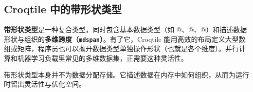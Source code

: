 \subsection*{Croqtile 中的带形状类型}

\textbf{带形状类型}是一种复合类型，同时包含基本数据类型（如 @、@、@）和描述数据形状与组织的\textbf{多维跨度（\texttt{mdspan}）}。有了它，Croqtile 能用高效的布局定义大型数组或矩阵，程序员也可以抛开数据类型单独操作形状（也就是各个维度）。并行计算和机器学习负载里常见的多维数据集，正需要这种灵活性。

带形状类型本身并不为数据分配存储。它描述数据在内存中如何组织，从而为运行时留出灵活性与优化空间。
